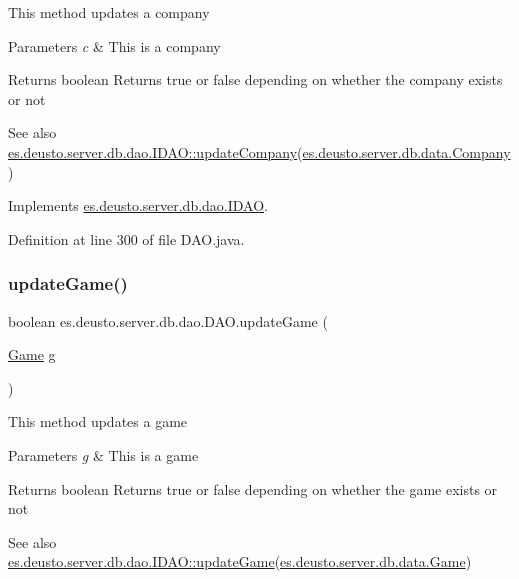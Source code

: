 This method updates a company 
\begin{DoxyParams}{Parameters}
{\em c} & This is a company \\
\hline
\end{DoxyParams}
\begin{DoxyReturn}{Returns}
boolean Returns true or false depending on whether the company exists or not 
\end{DoxyReturn}
\begin{DoxySeeAlso}{See also}
\hyperlink{interfacees_1_1deusto_1_1server_1_1db_1_1dao_1_1_i_d_a_o_a2d4302c61abd557f5a84d0698afdb814}{es.\+deusto.\+server.\+db.\+dao.\+I\+D\+A\+O\+::update\+Company}(\hyperlink{classes_1_1deusto_1_1server_1_1db_1_1data_1_1_company}{es.\+deusto.\+server.\+db.\+data.\+Company}) 
\end{DoxySeeAlso}


Implements \hyperlink{interfacees_1_1deusto_1_1server_1_1db_1_1dao_1_1_i_d_a_o_a2d4302c61abd557f5a84d0698afdb814}{es.\+deusto.\+server.\+db.\+dao.\+I\+D\+AO}.



Definition at line 300 of file D\+A\+O.\+java.

\mbox{\label{classes_1_1deusto_1_1server_1_1db_1_1dao_1_1_d_a_o_ae7540010b43f96c5e50995a8376614e7}} 
\subsubsection{\texorpdfstring{update\+Game()}{updateGame()}}
{\footnotesize\ttfamily boolean es.\+deusto.\+server.\+db.\+dao.\+D\+A\+O.\+update\+Game (\begin{DoxyParamCaption}\item[{\hyperlink{classes_1_1deusto_1_1server_1_1db_1_1data_1_1_game}{Game}}]{g }\end{DoxyParamCaption})}

This method updates a game 
\begin{DoxyParams}{Parameters}
{\em g} & This is a game \\
\hline
\end{DoxyParams}
\begin{DoxyReturn}{Returns}
boolean Returns true or false depending on whether the game exists or not 
\end{DoxyReturn}
\begin{DoxySeeAlso}{See also}
\hyperlink{interfacees_1_1deusto_1_1server_1_1db_1_1dao_1_1_i_d_a_o_a3a3ca0456879e35349a937aac661ff3f}{es.\+deusto.\+server.\+db.\+dao.\+I\+D\+A\+O\+::update\+Game}(\hyperlink{classes_1_1deusto_1_1server_1_1db_1_1data_1_1_game}{es.\+deusto.\+server.\+db.\+data.\+Game}) 
\end{DoxySeeAlso}


